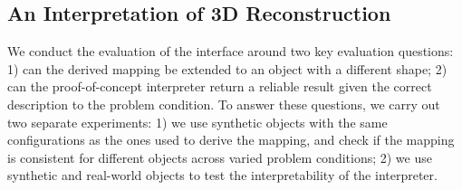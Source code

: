 

\subsection{An Interpretation of 3D Reconstruction}
We conduct the evaluation of the interface around two key evaluation questions: 1) can the derived mapping be extended to an object with a different shape; 2) can the proof-of-concept interpreter return a reliable result given the correct description to the problem condition. To answer these questions, we carry out two separate experiments: 1) we use synthetic objects with the same configurations as the ones used to derive the mapping, and check if the mapping is consistent for different objects across varied problem conditions; 2) we use synthetic and real-world objects to test the interpretability of the interpreter.


